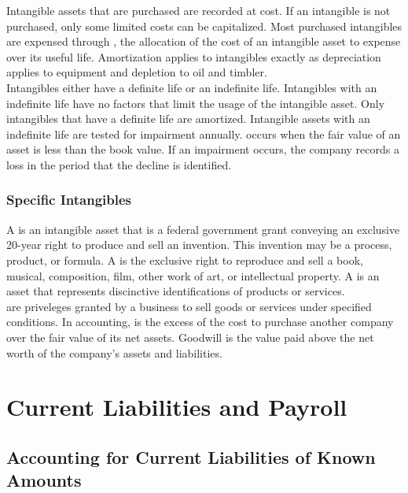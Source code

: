 \documentclass{article}
\begin{document}
Intangible assets that are purchased are recorded at cost. If an intangible is not purchased, only some limited costs can be capitalized. Most purchased intangibles are expensed through , the allocation of the cost of an intangible asset to expense over its useful life. Amortization applies to intangibles exactly as depreciation applies to equipment and depletion to oil and timbler. \\ 

Intangibles either have a definite life or an indefinite life. Intangibles with an indefinite life have no factors that limit the usage of the intangible asset. Only intangibles that have a definite life are amortized. Intangible assets with an indefinite life are tested for impairment annually.  occurs when the fair value of an asset is less than the book value. If an impairment occurs, the company records a loss in the period that the decline is identified. 

\subsubsection{Specific Intangibles}

A  is an intangible asset that is a federal government grant conveying an exclusive 20-year right to produce and sell an invention. This invention may be a process, product, or formula. A  is the exclusive right to reproduce and sell a book, musical, composition, film, other work of art, or intellectual property. A  is an asset that represents discinctive identifications of products or services. \\ 

 are priveleges granted by a business to sell goods or services under specified conditions. In accounting,  is the excess of the cost to purchase another company over the fair value of its net assets. Goodwill is the value paid above the net worth of the company's assets and liabilities. 

\section{Current Liabilities and Payroll}

\subsection{Accounting for Current Liabilities of Known Amounts}
\end{document}

